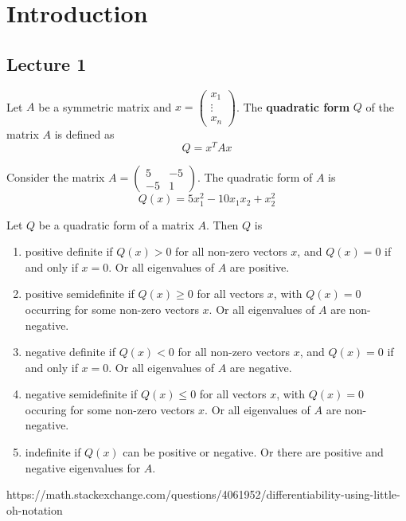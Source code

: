 \documentclass[main.tex]{subfiles}
\begin{document}
\section{Introduction}
\subsection{Lecture 1}
\begin{definition}
    Let $A$ be a symmetric matrix and $x = \begin{pmatrix}
        x_1 \\ \vdots \\ x_n
    \end{pmatrix}$. The \textbf{quadratic form} $Q$ of the matrix $A$ is defined as $$Q = x^T Ax$$
\end{definition}

\begin{Example}
    Consider the matrix $A = \begin{pmatrix}
        5 & -5 \\
        -5 & 1
    \end{pmatrix}$. The quadratic form of $A$ is $$Q(x) = 5x^2_1 - 10x_1x_2 + x^2_2$$
\end{Example}
\begin{definition}
    Let $Q$ be a quadratic form of a matrix $A$. Then $Q$ is
    \begin{enumerate}
        \item positive definite if $Q(x) > 0$ for all non-zero vectors $x$, and $Q(x) = 0$ if and only if $x = 0$. Or all eigenvalues of $A$ are positive.
        \item positive semidefinite if $Q(x) \geq 0$ for all vectors $x$, with $Q(x) = 0$ occurring for some non-zero vectors $x$. Or all eigenvalues of $A$ are non-negative.
        \item negative definite if $Q(x) < 0$ for all non-zero vectors $x$, and $Q(x) = 0$ if and only if $x = 0$. Or all eigenvalues of $A$ are negative.
        \item negative semidefinite if $Q(x) \leq 0$ for all vectors $x$, with $Q(x) = 0$ occuring for some non-zero vectors $x$. Or all eigenvalues of $A$ are non-negative.
        \item indefinite if $Q(x)$ can be positive or negative. Or there are positive and negative eigenvalues for $A$.
    \end{enumerate}
\end{definition}

\begin{definition}
    https://math.stackexchange.com/questions/4061952/differentiability-using-little-oh-notation
\end{definition}
\end{document}
